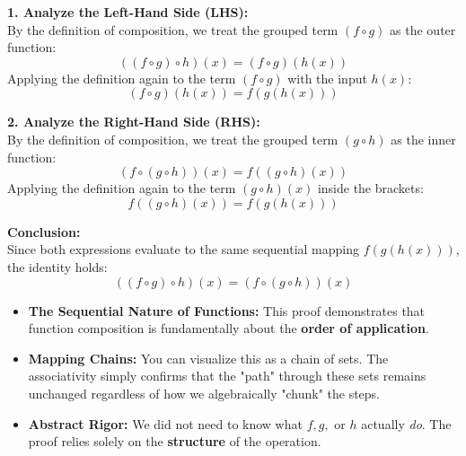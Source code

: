\begin{solution}
\textbf{1. Analyze the Left-Hand Side (LHS):} \\
By the definition of composition, we treat the grouped term $(f \circ g)$ as the outer function:
\[ ((f \circ g) \circ h)(x) = (f \circ g)(h(x)) \]
Applying the definition again to the term $(f \circ g)$ with the input $h(x)$:
\[ (f \circ g)(h(x)) = f(g(h(x))) \]

\textbf{2. Analyze the Right-Hand Side (RHS):} \\
By the definition of composition, we treat the grouped term $(g \circ h)$ as the inner function:
\[ (f \circ (g \circ h))(x) = f((g \circ h)(x)) \]
Applying the definition again to the term $(g \circ h)(x)$ inside the brackets:
\[ f((g \circ h)(x)) = f(g(h(x))) \]

\textbf{Conclusion:} \\
Since both expressions evaluate to the same sequential mapping $f(g(h(x)))$, the identity holds:
\[ ((f \circ g) \circ h)(x) = (f \circ (g \circ h))(x) \]
\end{solution}

\begin{takeaways}
\begin{itemize}[leftmargin=*]
\item \textbf{The Sequential Nature of Functions:} This proof demonstrates that function composition is fundamentally about the \textbf{order of application}. 
\item \textbf{Mapping Chains:} You can visualize this as a chain of sets. The associativity simply confirms that the "path" through these sets remains unchanged regardless of how we algebraically "chunk" the steps.
\item \textbf{Abstract Rigor:} We did not need to know what $f, g,$ or $h$ actually \emph{do}. The proof relies solely on the \textbf{structure} of the operation.
\end{itemize}
\end{takeaways}


